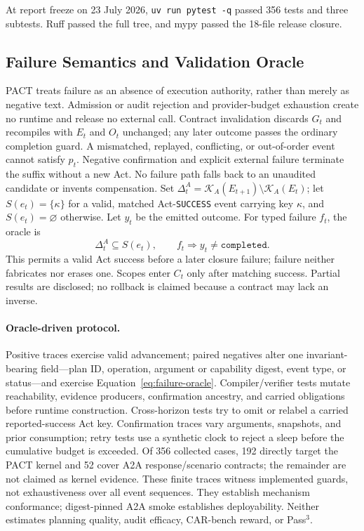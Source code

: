 \documentclass{article}
\begin{document}
At report freeze on 23 July 2026, \texttt{uv run pytest -q} passed 356 tests
and three subtests.  Ruff passed the full tree, and mypy passed the 18-file
release closure.

\subsection{Failure Semantics and Validation Oracle}

PACT treats failure as an absence of execution authority, rather than merely
as negative text.  Admission or audit rejection and provider-budget exhaustion
create no runtime and release no external call.  Contract invalidation discards
$G_t$ and recompiles with $E_t$ and $O_t$ unchanged; any later outcome passes
the ordinary completion guard.  A mismatched, replayed, conflicting, or
out-of-order event cannot satisfy $p_t$.  Negative confirmation and explicit
external failure terminate the suffix without a new Act.  No failure path
falls back to an unaudited candidate or invents compensation.  Set
$\Delta_t^A=\mathcal{K}_{A}(E_{t+1})\setminus\mathcal{K}_{A}(E_t)$; let
$S(e_t)=\{\kappa\}$ for a valid, matched Act-\texttt{SUCCESS} event carrying
key $\kappa$, and $S(e_t)=\varnothing$ otherwise.  Let $y_t$ be the emitted
outcome.  For typed failure $f_t$, the oracle is
\begin{equation}
\Delta_t^A\subseteq S(e_t),\qquad
f_t\Longrightarrow y_t\neq\texttt{completed}.
\label{eq:failure-oracle}
\end{equation}
This permits a valid Act success before a later closure failure; failure
neither fabricates nor erases one.  Scopes enter $C_t$ only after matching
success.  Partial results are disclosed; no rollback is claimed because a
contract may lack an inverse.

\paragraph{Oracle-driven protocol.}
Positive traces exercise valid advancement; paired negatives alter one
invariant-bearing field---plan ID, operation, argument or capability digest,
event type, or status---and exercise Equation~\ref{eq:failure-oracle}.
Compiler/verifier tests mutate reachability, evidence producers, confirmation
ancestry, and carried obligations before runtime construction.  Cross-horizon
tests try to omit or relabel a carried reported-success Act key.  Confirmation
traces vary arguments, snapshots, and prior consumption; retry tests use a
synthetic clock to reject a sleep before the cumulative budget is exceeded.
Of 356 collected cases, 192 directly target the PACT kernel and 52 cover A2A
response/scenario contracts; the remainder are not claimed as kernel evidence.
These finite traces witness implemented guards, not exhaustiveness over all
event sequences.  They establish mechanism conformance; digest-pinned A2A
smoke establishes deployability.  Neither estimates planning quality, audit
efficacy, CAR-bench reward, or Pass$^3$.
\end{document}
